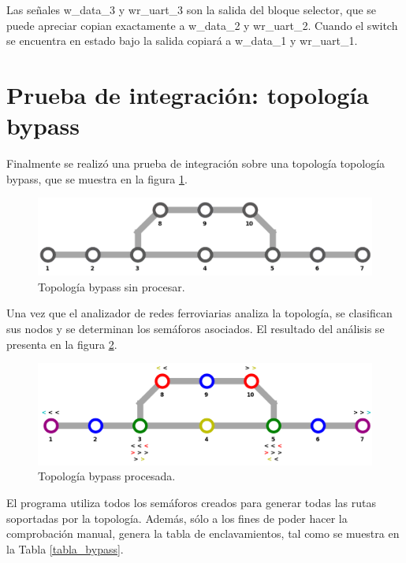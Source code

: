 	\vspace{5cm}
			
	Las señales w\_data\_3 y wr\_uart\_3 son la salida del bloque selector, que se puede apreciar copian exactamente a w\_data\_2 y wr\_uart\_2. Cuando el switch se encuentra en estado bajo la salida copiará a w\_data\_1 y wr\_uart\_1.
	
\section{Prueba de integración: topología bypass}

	Finalmente se realizó una prueba de integración sobre una topología topología bypass, que se muestra en la figura \ref{fig:Bypass_1}.

	\begin{figure}[h]
	\centering
	\includegraphics[scale=0.5]{./Figures/Mapa_2_B}
		\caption{Topología bypass sin procesar.}
		\label{fig:Bypass_1}
	\end{figure}
	
	Una vez que el analizador de redes ferroviarias analiza la topología, se clasifican sus nodos y se determinan los semáforos asociados. El resultado del análisis se presenta en la figura \ref{fig:Bypass_2}.

	\begin{figure}[h]
	\centering
	\includegraphics[scale=0.5]{./Figures/Mapa_2}
		\caption{Topología bypass procesada.}
		\label{fig:Bypass_2}
	\end{figure}
	
	El programa utiliza todos los semáforos creados para generar todas las rutas soportadas por la topología. Además, sólo a los fines de poder hacer la comprobación manual, genera la tabla de enclavamientos, tal como se muestra en la Tabla \ref{tabla_bypass}.

